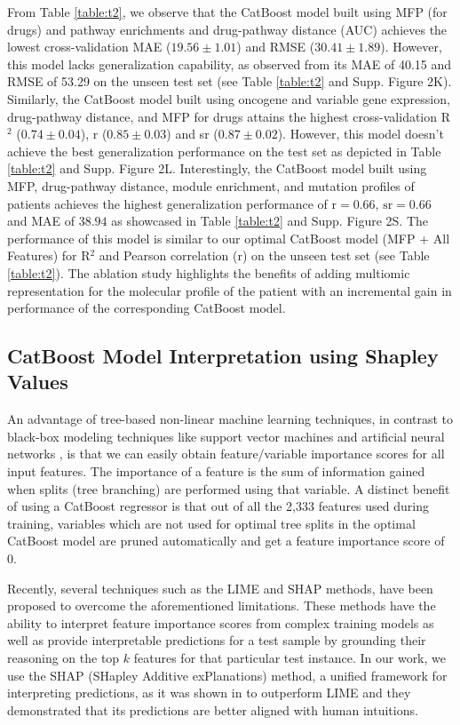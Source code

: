 \documentclass[pdflatex,sn-mathphys-num]{sn-jnl}%
\theoremstyle{thmstyleone}%
\theoremstyle{thmstyletwo}%
\theoremstyle{thmstylethree}%
\begin{document}
From Table \ref{table:t2}, we observe that the CatBoost model built using MFP (for drugs) and pathway enrichments and drug-pathway distance (AUC) achieves the lowest cross-validation MAE ($19.56 \pm 1.01$) and RMSE ($30.41 \pm 1.89$). However, this model lacks generalization capability, as observed from its MAE of 40.15 and RMSE of 53.29 on the unseen test set (see Table \ref{table:t2} and Supp. Figure 2K). Similarly, the CatBoost model built using oncogene and variable gene expression, drug-pathway distance, and MFP for drugs attains the highest cross-validation R$^2$ ($0.74 \pm 0.04$), r ($0.85 \pm 0.03$) and sr ($0.87 \pm 0.02$). However, this model doesn't achieve the best generalization performance on the test set as depicted in Table \ref{table:t2} and Supp. Figure 2L. Interestingly, the CatBoost model built using MFP, drug-pathway distance, module enrichment, and mutation profiles of patients achieves the highest generalization performance of $\text{r}=0.66$, $\text{sr}=0.66$ and MAE of $38.94$ as showcased in Table \ref{table:t2} and Supp. Figure 2S. The performance of this model is similar to our optimal CatBoost model (MFP + All Features) for R$^2$ and Pearson correlation (r) on the unseen test set (see Table \ref{table:t2}). The ablation study highlights the benefits of adding multiomic representation for the molecular profile of the patient with an incremental gain in performance of the corresponding CatBoost model. 
\subsection{CatBoost Model Interpretation using Shapley Values}
An advantage of tree-based non-linear machine learning techniques, in contrast to black-box modeling techniques like support vector machines \cite{mall2015very} and artificial neural networks \cite{fausett2006fundamentals}, is that we can easily obtain feature/variable importance scores for all input features. The importance of a feature is the sum of information gained when splits (tree branching) are performed using that variable. A distinct benefit of using a CatBoost regressor is that out of all the 2,333 features used during training, variables which are not used for optimal tree splits in the optimal CatBoost model are pruned automatically and get a feature importance score of 0. 

Recently, several techniques such as the LIME \cite{ribeiro2016should} and SHAP \cite{lundberg2017unified} methods, have been proposed to overcome the aforementioned limitations. These methods have the ability to interpret feature importance scores from complex training models as well as provide interpretable predictions for a test sample by grounding their reasoning on the top $k$ features for that particular test instance. In our work, we use the SHAP (SHapley Additive exPlanations) method, a unified framework for interpreting predictions, as it was shown in \cite{lundberg2017unified} to outperform LIME and they demonstrated that its predictions are better aligned with human intuitions.
\end{document}
